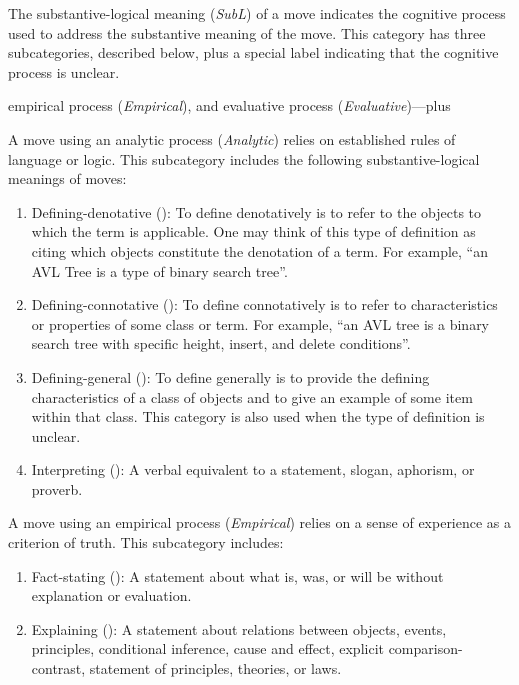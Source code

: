 \documentclass[conference]{IEEEtran}
\begin{document}
The substantive-logical meaning (\emph{SubL}) of a move indicates the cognitive
process used to address the substantive meaning of the move.
%
This category has three subcategories, described below, plus a special label
 indicating that the cognitive process is unclear.

empirical process (\emph{Empirical}), and evaluative process
(\emph{Evaluative})---plus 


A move using an analytic process (\emph{Analytic}) relies on established rules
of language or logic. This subcategory includes the following
substantive-logical meanings of moves:
%
\begin{enumerate}

\item Defining-denotative (): To define denotatively is to refer to
the objects to which the term is applicable. One may think of this type of
definition as citing which objects constitute the denotation of a term. For
example, ``an AVL Tree is a type of binary search tree''.

\item Defining-connotative (): To define connotatively is to refer to
characteristics or properties of some class or term. For example, ``an AVL tree
is a binary search tree with specific height, insert, and delete conditions''.

\item Defining-general (): To define generally is to provide the
defining characteristics of a class of objects and to give an example of some
item within that class. This category is also used when the type of definition
is unclear.

\item Interpreting (): A verbal equivalent to a statement, slogan,
aphorism, or proverb.

\end{enumerate}

\noindent
%
A move using an empirical process (\emph{Empirical}) relies on a sense of
experience as a criterion of truth. This subcategory includes:
%
\begin{enumerate}

\item Fact-stating (): A statement about what is, was, or will be
without explanation or evaluation.

\item Explaining (): A statement about relations between objects,
events, principles, conditional inference, cause and effect, explicit
comparison-contrast, statement of principles, theories, or laws.

\end{enumerate}
\end{document}
